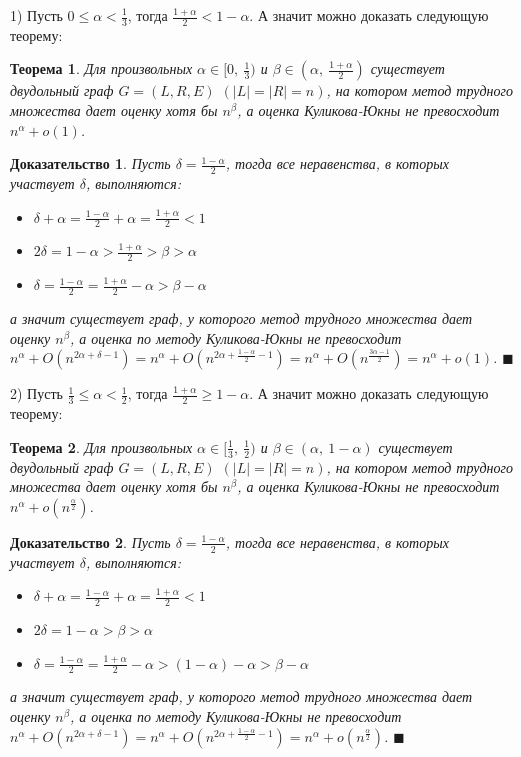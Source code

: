 \documentclass[a4paper]{article}
\newtheorem{mtheorem}{Теорема}[section]
\newtheorem*{msolution}{Доказательство}
\begin{document}
1) Пусть $0 \leq \alpha < \frac{1}{3}$, тогда $\frac{1+\alpha}{2} < 1 - \alpha$. А значит 
можно доказать следующую теорему:
\begin{mtheorem}
	Для произвольных $\alpha \in [0,\ \frac{1}{3})$ и $\beta \in (\alpha,\ \frac{1+\alpha}{2})$ существует 
	двудольный граф $G = (L, R, E)$ $(|L| = |R| = n)$, на котором метод трудного множества 
	дает оценку хотя бы $n^\beta$, а оценка Куликова-Юкны не превосходит $n^\alpha + o(1)$.
\end{mtheorem}
\begin{msolution}
	Пусть $\delta = \frac{1-\alpha}{2}$, тогда все неравенства, в которых участвует $\delta$, выполняются:
	\begin{itemize}[noitemsep]
		\item $\delta + \alpha = \frac{1-\alpha}{2} + \alpha = \frac{1+\alpha}{2} < 1$
		\item $2\delta = 1 - \alpha > \frac{1+\alpha}{2} > \beta > \alpha$
		\item $\delta = \frac{1-\alpha}{2} = \frac{1+\alpha}{2} - \alpha > \beta - \alpha$
	\end{itemize}
	а значит существует граф, у которого метод трудного множества дает оценку $n^{\beta}$, 
	а оценка по методу Куликова-Юкны не превосходит $n^\alpha + O(n^{2\alpha + \delta - 1}) = 
	n^\alpha + O(n^{2\alpha + \frac{1-\alpha}{2} - 1}) = n^{\alpha} + O(n^{\frac{3\alpha - 1}{2}}) = n^{\alpha} + o(1)$. $\blacksquare$
\end{msolution}

2) Пусть $\frac{1}{3} \leq \alpha < \frac{1}{2}$, тогда $\frac{1+\alpha}{2} \geq 1 - \alpha$. А значит 
можно доказать следующую теорему:
\begin{mtheorem}
	Для произвольных $\alpha \in [\frac{1}{3},\ \frac{1}{2})$ и $\beta \in (\alpha,\ 1-\alpha)$ существует 
	двудольный граф $G = (L, R, E)$ $(|L| = |R| = n)$, на котором метод трудного множества 
	дает оценку хотя бы $n^\beta$, а оценка Куликова-Юкны не превосходит $n^\alpha + o(n^{\frac{\alpha}{2}})$.
\end{mtheorem}
\begin{msolution}
	Пусть $\delta = \frac{1- \alpha}{2}$, тогда все неравенства, в которых участвует $\delta$, выполняются:
	\begin{itemize}[noitemsep]
		\item $\delta + \alpha = \frac{1 - \alpha}{2} + \alpha = \frac{1 + \alpha}{2} < 1$
		\item $2\delta = 1 - \alpha > \beta > \alpha$
		\item $\delta = \frac{1 - \alpha}{2} = \frac{1 + \alpha}{2} - \alpha > (1-\alpha) - \alpha > \beta - \alpha$
	\end{itemize}
	а значит существует граф, у которого метод трудного множества дает оценку $n^{\beta}$, 
	а оценка по методу Куликова-Юкны не превосходит $n^\alpha + O(n^{2\alpha + \delta - 1}) = 
	n^\alpha + O(n^{2\alpha + \frac{1-\alpha}{2} - 1}) = n^{\alpha} + o(n^{\frac{\alpha}{2}})$. $\blacksquare$
\end{msolution}
\end{document}
